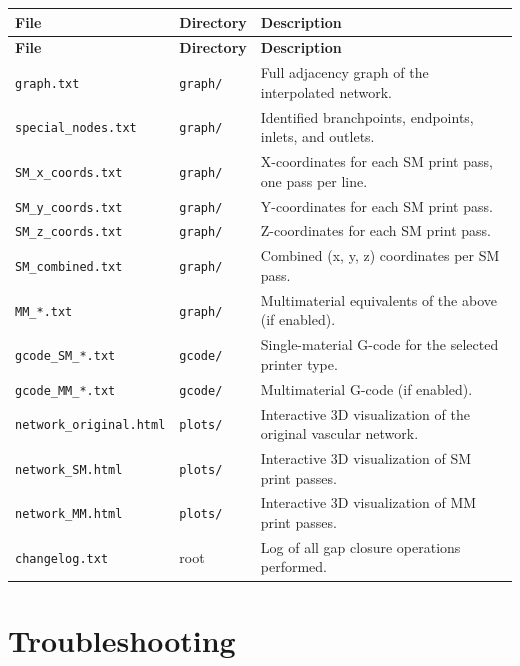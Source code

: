 \documentclass[11pt,letterpaper]{article}
\newcommand{\code}[1]{\texttt{#1}}
\begin{document}
\begin{longtable}{L{4cm} L{2cm} X}
\toprule
\textbf{File} & \textbf{Directory} & \textbf{Description} \\
\midrule
\endfirsthead
\toprule
\textbf{File} & \textbf{Directory} & \textbf{Description} \\
\midrule
\endhead
\code{graph.txt} & \code{graph/} & Full adjacency graph of the interpolated network. \\
\code{special\_nodes.txt} & \code{graph/} & Identified branchpoints, endpoints, inlets, and outlets. \\
\code{SM\_x\_coords.txt} & \code{graph/} & X-coordinates for each SM print pass, one pass per line. \\
\code{SM\_y\_coords.txt} & \code{graph/} & Y-coordinates for each SM print pass. \\
\code{SM\_z\_coords.txt} & \code{graph/} & Z-coordinates for each SM print pass. \\
\code{SM\_combined.txt} & \code{graph/} & Combined (x, y, z) coordinates per SM pass. \\
\code{MM\_*.txt} & \code{graph/} & Multimaterial equivalents of the above (if enabled). \\
\code{gcode\_SM\_*.txt} & \code{gcode/} & Single-material G-code for the selected printer type. \\
\code{gcode\_MM\_*.txt} & \code{gcode/} & Multimaterial G-code (if enabled). \\
\code{network\_original.html} & \code{plots/} & Interactive 3D visualization of the original vascular network. \\
\code{network\_SM.html} & \code{plots/} & Interactive 3D visualization of SM print passes. \\
\code{network\_MM.html} & \code{plots/} & Interactive 3D visualization of MM print passes. \\
\code{changelog.txt} & root & Log of all gap closure operations performed. \\
\bottomrule
\end{longtable}

\section{Troubleshooting}
\label{sec:troubleshooting}
\end{document}
